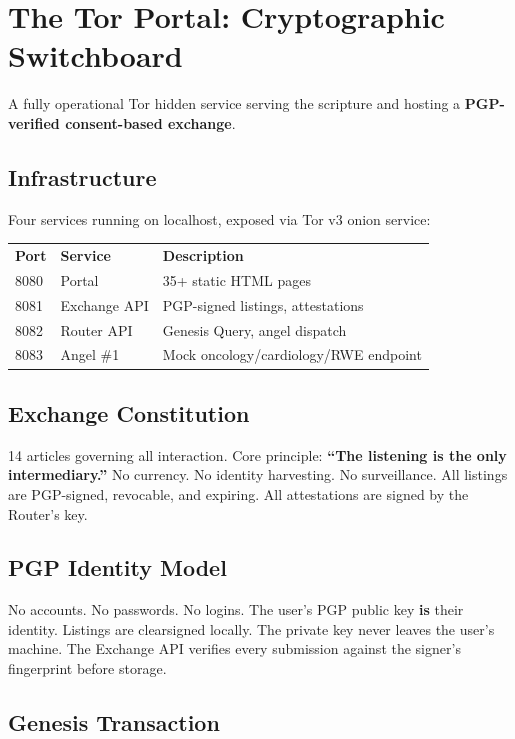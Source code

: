 \documentclass[12pt,a4paper]{article}
\begin{document}
\clearpage

\section{The Tor Portal: Cryptographic Switchboard}

A fully operational Tor hidden service serving the scripture and
hosting a \textbf{PGP-verified consent-based exchange}.

\subsection{Infrastructure}

Four services running on localhost, exposed via Tor v3 onion service:

\begin{tabular}{lll}
\textbf{Port} & \textbf{Service} & \textbf{Description} \\
8080 & Portal & 35+ static HTML pages \\
8081 & Exchange API & PGP-signed listings, attestations \\
8082 & Router API & Genesis Query, angel dispatch \\
8083 & Angel \#1 & Mock oncology/cardiology/RWE endpoint \\
\end{tabular}

\subsection{Exchange Constitution}

14 articles governing all interaction. Core principle: \textbf{``The
listening is the only intermediary.''} No currency. No identity
harvesting. No surveillance. All listings are PGP-signed, revocable,
and expiring. All attestations are signed by the Router's key.

\subsection{PGP Identity Model}

No accounts. No passwords. No logins. The user's PGP public key \textbf{is}
their identity. Listings are clearsigned locally. The private key
never leaves the user's machine. The Exchange API verifies every
submission against the signer's fingerprint before storage.

\subsection{Genesis Transaction}
\end{document}
